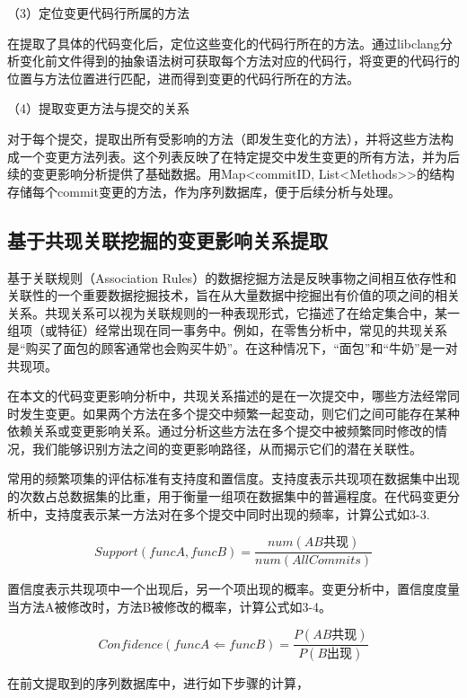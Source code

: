 （3）定位变更代码行所属的方法

在提取了具体的代码变化后，定位这些变化的代码行所在的方法。通过libclang分析变化前文件得到的抽象语法树可获取每个方法对应的代码行，将变更的代码行的位置与方法位置进行匹配，进而得到变更的代码行所在的方法。

（4）提取变更方法与提交的关系

对于每个提交，提取出所有受影响的方法（即发生变化的方法），并将这些方法构成一个变更方法列表。这个列表反映了在特定提交中发生变更的所有方法，并为后续的变更影响分析提供了基础数据。用Map<commitID, List<Methods>>的结构存储每个commit变更的方法，作为序列数据库，便于后续分析与处理。


\subsection{基于共现关联挖掘的变更影响关系提取}

基于关联规则（Association Rules）的数据挖掘方法是反映事物之间相互依存性和关联性的一个重要数据挖掘技术，旨在从大量数据中挖掘出有价值的项之间的相关关系。共现关系可以视为关联规则的一种表现形式，它描述了在给定集合中，某一组项（或特征）经常出现在同一事务中。例如，在零售分析中，常见的共现关系是“购买了面包的顾客通常也会购买牛奶”。在这种情况下，“面包”和“牛奶”是一对共现项。

在本文的代码变更影响分析中，共现关系描述的是在一次提交中，哪些方法经常同时发生变更。如果两个方法在多个提交中频繁一起变动，则它们之间可能存在某种依赖关系或变更影响关系。通过分析这些方法在多个提交中被频繁同时修改的情况，我们能够识别方法之间的变更影响路径，从而揭示它们的潜在关联性。


常用的频繁项集的评估标准有支持度和置信度。支持度表示共现项在数据集中出现的次数占总数据集的比重，用于衡量一组项在数据集中的普遍程度。在代码变更分析中，支持度表示某一方法对在多个提交中同时出现的频率，计算公式如3-3.

\begin{equation}
Support(funcA,funcB)=\frac{num(AB\text{共现})}{num(AllCommits)}
\end{equation}

置信度表示共现项中一个出现后，另一个项出现的概率。变更分析中，置信度度量当方法A被修改时，方法B被修改的概率，计算公式如3-4。

\begin{equation}
Confidence(funcA\Leftarrow funcB)=\frac{P(AB\text{共现})}{P(B\text{出现})}
\end{equation}

在前文提取到的序列数据库中，进行如下步骤的计算，



